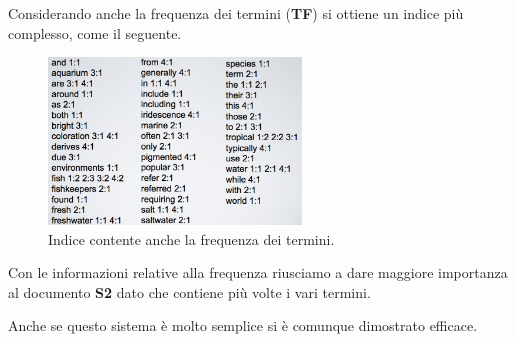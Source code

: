 Considerando anche la frequenza dei termini (\textbf{TF}) si ottiene un indice più complesso, come il seguente.

\begin{figure}[htbp]
	\centering
	\includegraphics[width=0.6\textwidth]{./images/l6-index-2}
	\caption{Indice contente anche la frequenza dei termini.}
\end{figure}

\noindent Con le informazioni relative alla frequenza riusciamo a dare maggiore importanza al documento \textbf{S2} dato che contiene più volte i vari termini.

Anche se questo sistema è molto semplice si è comunque dimostrato efficace.



